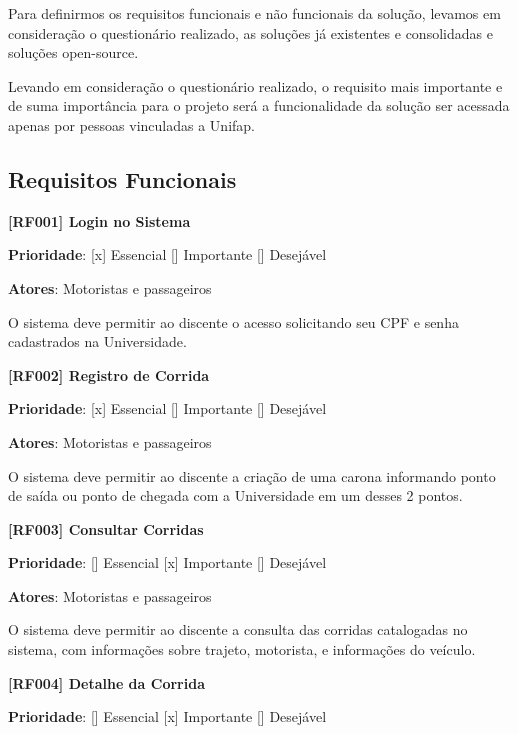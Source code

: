 Para definirmos os requisitos funcionais e não funcionais da solução, levamos em consideração o questionário realizado, as soluções já existentes e consolidadas e soluções open-source.

Levando em consideração o questionário realizado, o requisito mais importante e de suma importância para o projeto será a funcionalidade da solução ser acessada apenas por pessoas vinculadas a Unifap.







\subsection{Requisitos Funcionais}
\textbf{[RF001] Login no Sistema}

\textbf{Prioridade}:      [x] Essencial        [] Importante     [] Desejável 

\textbf{Atores}: Motoristas e passageiros


O sistema deve permitir ao discente o acesso solicitando seu CPF e senha cadastrados na Universidade.

\textbf{[RF002] Registro de Corrida}

\textbf{Prioridade}:      [x] Essencial        [] Importante     [] Desejável 

\textbf{Atores}: Motoristas e passageiros

O sistema deve permitir ao discente a criação de uma carona informando ponto de saída ou ponto de chegada com a Universidade em um desses 2 pontos.

\textbf{[RF003] Consultar Corridas}

\textbf{Prioridade}:      [] Essencial        [x] Importante     [] Desejável 

\textbf{Atores}: Motoristas e passageiros

O sistema deve permitir ao discente a consulta das corridas catalogadas no sistema, com informações sobre trajeto, motorista, e informações do veículo.

\textbf{[RF004] Detalhe da Corrida}

\textbf{Prioridade}:      [] Essencial        [x] Importante     [] Desejável 

